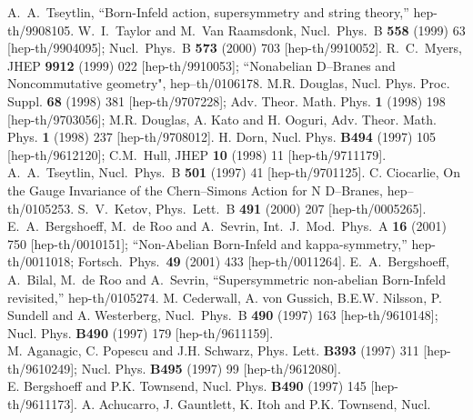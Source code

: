 \documentclass[a4paper,12pt]{article}
\begin{document}
\begin{thebibliography}{999}
A.~A.~Tseytlin, ``Born-Infeld action, supersymmetry and string
theory,'' hep-th/9908105.
W.~I.~Taylor and M.~Van Raamsdonk, Nucl.\ Phys.\ B {\bf 558}
(1999) 63 [hep-th/9904095];
Nucl.\ Phys.\ B {\bf 573} (2000) 703 [hep-th/9910052].
R.~C.~Myers,
JHEP {\bf 9912} (1999) 022 [hep-th/9910053];
``Nonabelian D--Branes and Noncommutative geometry",
hep--th/0106178.
{M.R. Douglas, Nucl. Phys. Proc. Suppl. {\bf 68} (1998)
381 [hep-th/9707228]; Adv. Theor. Math. Phys. {\bf 1} (1998) 198
[hep-th/9703056]; M.R. Douglas, A. Kato and H. Ooguri, Adv. Theor.
Math. Phys. {\bf 1} (1998) 237 [hep-th/9708012].}
H. Dorn, Nucl. Phys. {\bf B494} (1997) 105 [hep-th/9612120];
C.M.~Hull, JHEP {\bf 10} (1998) 11 [hep-th/9711179].
A.~A.~Tseytlin,
Nucl.\ Phys.\ B {\bf 501} (1997) 41 [hep-th/9701125].
C. Ciocarlie, On the Gauge Invariance of the Chern--Simons Action
for N D--Branes, hep--th/0105253.
S.~V.~Ketov,
Phys.\ Lett.\ B {\bf 491} (2000) 207 [hep-th/0005265].
E.~A.~Bergshoeff, M.~de Roo and A.~Sevrin,
Int.\ J.\ Mod.\ Phys.\ A {\bf 16} (2001) 750 [hep-th/0010151];
``Non-Abelian Born-Infeld and kappa-symmetry,'' hep-th/0011018;
Fortsch.\ Phys.\  {\bf 49} (2001) 433 [hep-th/0011264].
E.~A.~Bergshoeff, A.~Bilal, M.~de Roo and A.~Sevrin,
``Supersymmetric non-abelian Born-Infeld revisited,''
hep-th/0105274.
M. Cederwall, A. von Gussich, B.E.W. Nilsson, P. Sundell and A.
Westerberg, Nucl.\ Phys.\ B {\bf 490} (1997) 163 [hep-th/9610148];
Nucl. Phys. {\bf B490} (1997) 179 [hep-th/9611159].\\
M. Aganagic, C. Popescu and J.H. Schwarz, Phys. Lett. {\bf B393}
(1997) 311 [hep-th/9610249]; Nucl. Phys. {\bf B495} (1997) 99
[hep-th/9612080].\\
E. Bergshoeff and P.K. Townsend, Nucl. Phys.
{\bf B490} (1997) 145 [hep-th/9611173].
A. Achucarro, J. Gauntlett, K. Itoh and P.K. Townsend, {Nucl.
}
\end{thebibliography}
\end{document}
